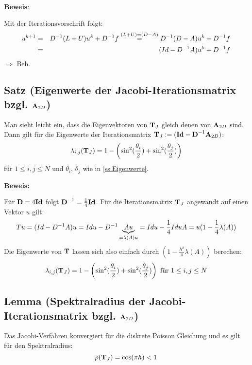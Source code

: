 \textbf{Beweis}:

Mit der Iterationsvorschrift folgt:
\begin{eqnarray}
u^{k+1} &=& D^{-1}(L+U)u^{k} + D^{-1}f \overset{(L+U)=(D-A)}{=} D^{-1}(D-A)u^{k}+D^{-1}f \notag \\
&=& (Id-D^{-1}A)u^{k} + D^{-1}f \notag
\end{eqnarray}
$\Longrightarrow$ Beh.

\subsection{Satz (Eigenwerte der Jacobi-Iterationsmatrix bzgl. ${\textbf{A}}_{2D}$)}\label{ss.EW Jacobi}

Man sieht leicht ein, dass die Eigenvektoren von ${\textbf{T}}_{J}$ gleich denen von ${\textbf{A}}_{2D}$ sind. Dann gilt für die Eigenwerte der Iterationsmatrix ${\textbf{T}}_{J} := ({\textbf{Id}} - {\textbf{D}}^{-1}{\textbf{A}}_{2D})$:
\begin{equation}
\lambda_{i,j}({\textbf{T}}_{J}) = 1 - \left(\sin^{2}(\frac {\theta_{i}} {2}) + \sin^{2}(\frac {\theta_{j}} {2}) \right) \label{eq.Jacobi-Eigenwerte}
\end{equation}
für $1 \le i,j \le N$ und $\theta_{i}$, $\theta_{j}$ wie in \autoref{ss.Eigenwerte}.

\textbf{Beweis:}\label{b.EW Jacobi}

Für ${\textbf{D}} = 4 {\textbf{Id}}$ folgt ${\textbf{D}}^{-1} = \frac {1} {4} {\textbf{Id}}$. Für die Iterationsmatrix ${\textbf{T}}_{J}$ angewandt auf einen Vektor $u$ gilt:
\begin{eqnarray}
Tu = (Id - D^{-1}A)u = Id u - D^{-1} \underbrace{Au}_{=\lambda(A) u} = Id u - \frac {1} {4} Id u A = u (1 - \frac {1} {4} \lambda(A)) \notag
\end{eqnarray}
Die Eigenwerte von ${\textbf{T}}$ lassen sich also einfach durch $(1 - \frac {h^{2}} {4} \lambda(A))$ berechen:
\begin{equation}
\lambda_{i,j}({\textbf{T}}_{J}) = 1 - \left(\sin^{2}(\frac {\theta_{i}} {2}) + \sin^{2}(\frac {\theta_{j}} {2}) \right) \textnormal{ für } 1 \le i,j \le N \notag
\end{equation}

\subsection{Lemma (Spektralradius der Jacobi-Iterationsmatrix bzgl. ${\textbf{A}}_{2D}$)}\label{ss.Spektralradius Jacobi}

Das Jacobi-Verfahren konvergiert für die diskrete Poisson Gleichung und es gilt für den Spektralradius:
\begin{equation}
\rho({\textbf{T}}_{J}) = \cos(\pi h) < 1
\end{equation}

